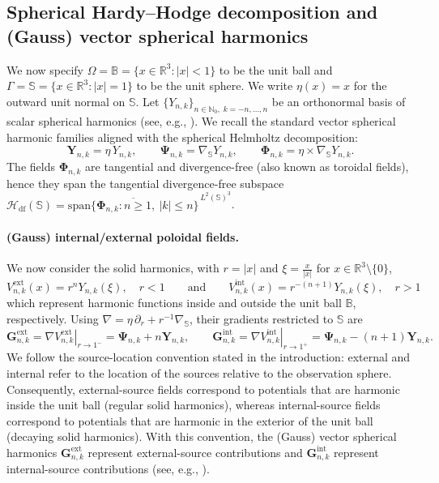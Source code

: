 \documentclass[a4paper, 11pt]{article}
\renewcommand{\SS}{\mathbb{S}}
\newcommand{\BB}{\mathbb{B}}
\newcommand{\R}{\mathbb{R}}
\begin{document}
\subsection{Spherical Hardy--Hodge decomposition and (Gauss) vector spherical harmonics}\label{subsec:spherical-hhd}

We now specify $\Omega=\mathbb{B}=\{x\in\R^3:|x|<1\}$ to be the unit ball and $\Gamma=\SS=\{x\in\mathbb R^3:|x|=1\}$ to be the unit sphere. We write $\eta(x)=x$ for the outward unit normal on $\SS$. Let $\{Y_{n,k}\}_{n\in\mathbb N_0,\;k=-n,\dots,n}$ be an orthonormal basis of scalar spherical harmonics (see, e.g., \cite{freedenschreiner09,mueller96}). We recall the standard vector spherical harmonic families aligned with the spherical Helmholtz decomposition: 
\begin{equation}\label{eq:vsh-families}
\mathbf Y_{n,k}=\eta\,Y_{n,k},\qquad 
\mathbf\Psi_{n,k}=\nabla_\SS Y_{n,k},\qquad
\mathbf\Phi_{n,k}=\eta\times\nabla_\SS Y_{n,k}.
\end{equation}
The fields $\mathbf\Phi_{n,k}$ are tangential and divergence-free (also known as {toroidal} fields), hence they span the tangential divergence-free subspace $\mathcal H_{\mathrm{df}}(\SS)
= \overline{\mathrm{span}\{\mathbf\Phi_{n,k}:n\ge1,\ |k|\le n\}}^{\,L^2(\SS)^3}$.

\paragraph{(Gauss) internal/external poloidal fields.}
We now consider the solid harmonics, with $r=|x|$ and $\xi=\tfrac{x}{|x|}$ for $x\in \mathbb{R}^3\setminus\{0\}$,
\[
V^{\mathrm{ext}}_{n,k}(x)=r^nY_{n,k}(\xi),\quad r<1\qquad \text{and} \qquad
V^{\mathrm{int}}_{n,k}(x)=r^{-(n+1)}Y_{n,k}(\xi), \quad r>1
\]
which represent harmonic functions inside and outside the unit ball $\BB$, respectively.
Using $\nabla = \eta\,\partial_r + r^{-1}\nabla_\SS$, their gradients restricted to $\SS$ are
\begin{equation}\label{eq:gauss-vsh}
\mathbf G^{\mathrm{ext}}_{n,k}=\left.\nabla V^{\mathrm{ext}}_{n,k}\right|_{r\to 1^-}
= \mathbf\Psi_{n,k} + n\mathbf Y_{n,k},
\qquad
\mathbf G^{\mathrm{int}}_{n,k}=\left.\nabla V^{\mathrm{int}}_{n,k}\right|_{r\to 1^+}
= \mathbf\Psi_{n,k}-(n+1)\mathbf Y_{n,k}.
\end{equation}
We follow the {source-location} convention stated in the introduction: {external} and {internal} refer to the location of the sources relative to the observation sphere.
Consequently, external-source fields correspond to potentials that are harmonic {inside} the unit ball (regular solid harmonics), whereas internal-source fields correspond to potentials that are harmonic in the {exterior} of the unit ball (decaying solid harmonics). With this convention, the (Gauss) vector spherical harmonics $\mathbf G^{\mathrm{ext}}_{n,k}$ represent {external-source} contributions and $\mathbf G^{\mathrm{int}}_{n,k}$ represent {internal-source} contributions (see, e.g., \cite{backus1996,freedengerhards12,Mayer2006,olsen10b}).
\end{document}
